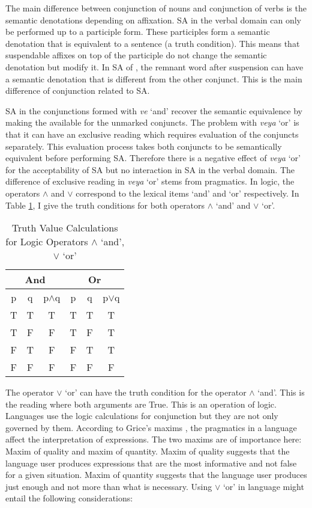 The main difference between conjunction of nouns and conjunction of verbs is the semantic denotations depending on affixation. SA in the verbal domain can only be performed up to a participle form. These participles form a semantic denotation that is equivalent to a sentence (a truth condition). This means that suspendable affixes on top of the participle do not change the semantic denotation but modify it. In SA of {\Case}, the remnant word after suspension can have a semantic denotation that is different from the other conjunct. This is the main difference of conjunction related to SA.

SA in the conjunctions formed with \textit{ve} `and' recover the semantic equivalence by making the {\Case} available for the unmarked conjuncts. The problem with \textit{veya} `or' is that it can have an exclusive reading which requires evaluation of the conjuncts separately. This evaluation process takes both conjuncts to be semantically equivalent before performing SA. Therefore there is a negative effect of \textit{veya} `or' for the acceptability of {\Case} SA but no interaction in SA in the verbal domain. The difference of exclusive reading in \textit{veya} `or' stems from pragmatics. In logic, the operators $\wedge$ and $\vee$ correspond to the lexical items `and' and `or' respectively. In Table \ref{tab:operators}, I give the truth conditions for both operators $\wedge$ `and' and $\vee$ `or'.

\begin{table}[hbt!]
    \centering
    \caption{Truth Value Calculations for Logic Operators $\wedge$ `and', $\vee$ `or'}
    \begin{tabular}{|cc|c|cc|c|}
    \hline
        \multicolumn{3}{|c|}{And} & \multicolumn{3}{|c|}{Or} \\ \hline
        p & q & p$\wedge$q & p & q & p$\vee$q \\ \hline
        T & T & T & T & T & T \\
        T & F & F & T & F & T \\
        F & T & F & F & T & T \\
        F & F & F & F & F & F \\
    \hline    
    \end{tabular}
    \label{tab:operators}
\end{table}

The operator $\vee$ `or' can have the truth condition for the operator $\wedge$ `and'. This is the reading where both arguments are True. This is an operation of logic. Languages use the logic calculations for conjunction but they are not only governed by them. According to Grice's maxims \citep{grice1989studies}, the pragmatics in a language affect the interpretation of expressions. The two maxims are of importance here: Maxim of quality and maxim of quantity. Maxim of quality suggests that the language user produces expressions that are the most informative and not false for a given situation. Maxim of quantity suggests that the language user produces just enough and not more than what is necessary. Using $\vee$ `or' in language might entail the following considerations:

